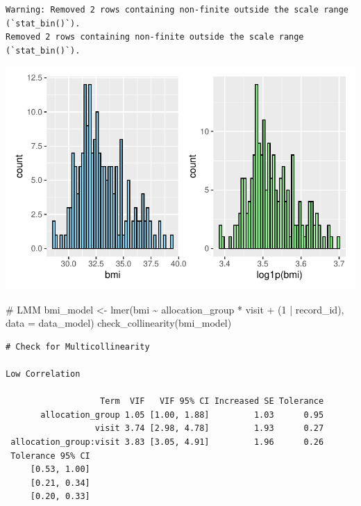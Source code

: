 \documentclass[
  letterpaper,
  DIV=11,
  numbers=noendperiod]{scrartcl}
\newenvironment{Shaded}{\begin{snugshade}}{\end{snugshade}}
\newcommand{\AttributeTok}[1]{\textcolor[rgb]{0.40,0.45,0.13}{#1}}
\newcommand{\CommentTok}[1]{\textcolor[rgb]{0.37,0.37,0.37}{#1}}
\newcommand{\DecValTok}[1]{\textcolor[rgb]{0.68,0.00,0.00}{#1}}
\newcommand{\FunctionTok}[1]{\textcolor[rgb]{0.28,0.35,0.67}{#1}}
\newcommand{\NormalTok}[1]{\textcolor[rgb]{0.00,0.23,0.31}{#1}}
\newcommand{\OtherTok}[1]{\textcolor[rgb]{0.00,0.23,0.31}{#1}}
\newcommand{\SpecialCharTok}[1]{\textcolor[rgb]{0.37,0.37,0.37}{#1}}
\begin{document}
\begin{verbatim}
Warning: Removed 2 rows containing non-finite outside the scale range (`stat_bin()`).
Removed 2 rows containing non-finite outside the scale range (`stat_bin()`).
\end{verbatim}

\includegraphics{Outcomes_V1V2V3_files/figure-pdf/bmi_1-1.pdf}

\begin{Shaded}
\begin{Highlighting}[]
\CommentTok{\# LMM}
\NormalTok{bmi\_model }\OtherTok{\textless{}{-}} \FunctionTok{lmer}\NormalTok{(bmi }\SpecialCharTok{\textasciitilde{}}\NormalTok{ allocation\_group }\SpecialCharTok{*}\NormalTok{ visit }\SpecialCharTok{+}\NormalTok{ (}\DecValTok{1} \SpecialCharTok{|}\NormalTok{ record\_id), }\AttributeTok{data =}\NormalTok{ data\_model)}
\FunctionTok{check\_collinearity}\NormalTok{(bmi\_model)}
\end{Highlighting}
\end{Shaded}

\begin{verbatim}
# Check for Multicollinearity

Low Correlation

                   Term  VIF   VIF 95% CI Increased SE Tolerance
       allocation_group 1.05 [1.00, 1.88]         1.03      0.95
                  visit 3.74 [2.98, 4.78]         1.93      0.27
 allocation_group:visit 3.83 [3.05, 4.91]         1.96      0.26
 Tolerance 95% CI
     [0.53, 1.00]
     [0.21, 0.34]
     [0.20, 0.33]
\end{verbatim}
\end{document}
